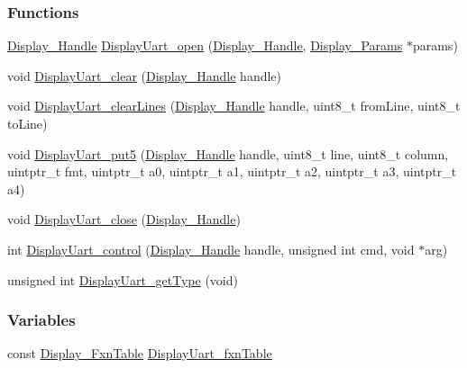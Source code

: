 \subsubsection*{Functions}
\begin{DoxyCompactItemize}
\item 
\hyperlink{_display_8h_a045a26811755aabf1886d982c49e54ab}{Display\+\_\+\+Handle} \hyperlink{_display_uart_8h_a58c8e11f0be124287ada48de65c848d9}{Display\+Uart\+\_\+open} (\hyperlink{_display_8h_a045a26811755aabf1886d982c49e54ab}{Display\+\_\+\+Handle}, \hyperlink{struct_display___params}{Display\+\_\+\+Params} $\ast$params)
\item 
void \hyperlink{_display_uart_8h_a3adb09a819a500fb7c236747067bea0c}{Display\+Uart\+\_\+clear} (\hyperlink{_display_8h_a045a26811755aabf1886d982c49e54ab}{Display\+\_\+\+Handle} handle)
\item 
void \hyperlink{_display_uart_8h_aefc6253ba3fefbe78c19f5f412297e6d}{Display\+Uart\+\_\+clear\+Lines} (\hyperlink{_display_8h_a045a26811755aabf1886d982c49e54ab}{Display\+\_\+\+Handle} handle, uint8\+\_\+t from\+Line, uint8\+\_\+t to\+Line)
\item 
void \hyperlink{_display_uart_8h_a7077c4aa704496057a17e156851cc9f8}{Display\+Uart\+\_\+put5} (\hyperlink{_display_8h_a045a26811755aabf1886d982c49e54ab}{Display\+\_\+\+Handle} handle, uint8\+\_\+t line, uint8\+\_\+t column, uintptr\+\_\+t fmt, uintptr\+\_\+t a0, uintptr\+\_\+t a1, uintptr\+\_\+t a2, uintptr\+\_\+t a3, uintptr\+\_\+t a4)
\item 
void \hyperlink{_display_uart_8h_a815c5303af098b7fe30725cdbb3456c0}{Display\+Uart\+\_\+close} (\hyperlink{_display_8h_a045a26811755aabf1886d982c49e54ab}{Display\+\_\+\+Handle})
\item 
int \hyperlink{_display_uart_8h_ac7d0522532a79aa97c808f1a01d40b04}{Display\+Uart\+\_\+control} (\hyperlink{_display_8h_a045a26811755aabf1886d982c49e54ab}{Display\+\_\+\+Handle} handle, unsigned int cmd, void $\ast$arg)
\item 
unsigned int \hyperlink{_display_uart_8h_aa7e1e84aec144b836ae9ccc26cadb60c}{Display\+Uart\+\_\+get\+Type} (void)
\end{DoxyCompactItemize}
\subsubsection*{Variables}
\begin{DoxyCompactItemize}
\item 
const \hyperlink{struct_display___fxn_table}{Display\+\_\+\+Fxn\+Table} \hyperlink{_display_uart_8h_a10c6aa83bc55d8ebc6f8ff01da3fde4e}{Display\+Uart\+\_\+fxn\+Table}
\end{DoxyCompactItemize}


